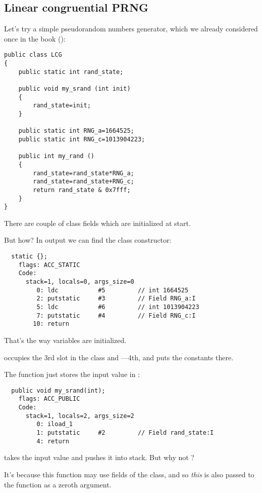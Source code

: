 \subsection{Linear congruential \ac{PRNG}}

Let's try a simple pseudorandom numbers generator, 
which we already considered once in the book ():


\begin{lstlisting}[style=customjava]
public class LCG 
{
	public static int rand_state;

	public void my_srand (int init)
	{
		rand_state=init;
	}

	public static int RNG_a=1664525;
	public static int RNG_c=1013904223;

	public int my_rand ()
	{
		rand_state=rand_state*RNG_a;
		rand_state=rand_state+RNG_c;
		return rand_state & 0x7fff;
	}
}
\end{lstlisting}

There are couple of class fields which are initialized at start.

But how?
In  output we can find the class constructor:


\begin{lstlisting}
  static {};
    flags: ACC_STATIC
    Code:
      stack=1, locals=0, args_size=0
         0: ldc           #5         // int 1664525
         2: putstatic     #3         // Field RNG_a:I
         5: ldc           #6         // int 1013904223
         7: putstatic     #4         // Field RNG_c:I
        10: return        
\end{lstlisting}

That's the way variables are initialized.

 occupies the 3rd slot in the class and ---4th, 
and  puts the constants there.


The  function just stores the input value in :


\begin{lstlisting}
  public void my_srand(int);
    flags: ACC_PUBLIC
    Code:
      stack=1, locals=2, args_size=2
         0: iload_1       
         1: putstatic     #2         // Field rand_state:I
         4: return        
\end{lstlisting}

 takes the input value and pushes it into stack. But why not ?

It's because this function may use fields of the class, and so \emph{this} is also passed to
the function as a zeroth argument.

